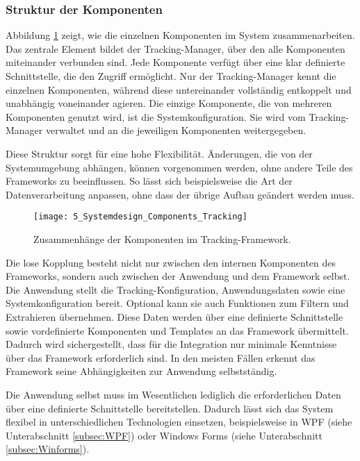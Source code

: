 \subsubsection{Struktur der Komponenten}
Abbildung \ref{fig:system_design_components} zeigt, wie die einzelnen Komponenten im System zusammenarbeiten. Das zentrale Element bildet der {Tracking-Manager}, über den alle Komponenten miteinander verbunden sind. Jede Komponente verfügt über eine klar definierte Schnittstelle, die den Zugriff ermöglicht. Nur der Tracking-Manager kennt die einzelnen Komponenten, während diese untereinander vollständig entkoppelt und unabhängig voneinander agieren. Die einzige Komponente, die von mehreren Komponenten genutzt wird, ist die Systemkonfiguration. Sie wird vom Tracking-Manager verwaltet und an die jeweiligen Komponenten weitergegeben.

Diese Struktur sorgt für eine hohe Flexibilität. Änderungen, die von der Systemumgebung abhängen, können vorgenommen werden, ohne andere Teile des Frameworks zu beeinflussen. So lässt sich beispielsweise die Art der Datenverarbeitung anpassen, ohne dass der übrige Aufbau geändert werden muss.

\begin{figure}[H]
    \centering
    \texttt{[image: 5\_Systemdesign\_Components\_Tracking]}
    \caption{Zusammenhänge der Komponenten im Tracking-Framework.}
    \label{fig:system_design_components}
\end{figure}

Die lose Kopplung besteht nicht nur zwischen den internen Komponenten des Frameworks, sondern auch zwischen der Anwendung und dem Framework selbst. Die Anwendung stellt die Tracking-Konfiguration, Anwendungsdaten sowie eine Systemkonfiguration bereit. Optional kann sie auch Funktionen zum Filtern und Extrahieren übernehmen.
Diese Daten werden über eine definierte Schnittstelle sowie vordefinierte Komponenten und Templates an das Framework übermittelt. Dadurch wird sichergestellt, dass für die Integration nur minimale Kenntnisse über das Framework erforderlich sind. In den meisten Fällen erkennt das Framework seine Abhängigkeiten zur Anwendung selbstständig.

Die Anwendung selbst muss im Wesentlichen lediglich die erforderlichen Daten über eine definierte Schnittstelle bereitstellen. Dadurch lässt sich das System flexibel in unterschiedlichen Technologien einsetzen, beispielsweise in WPF (siehe Unterabschnitt \ref{subsec:WPF}) oder Windows Forms (siehe Unterabschnitt \ref{subsec:Winforms}).

